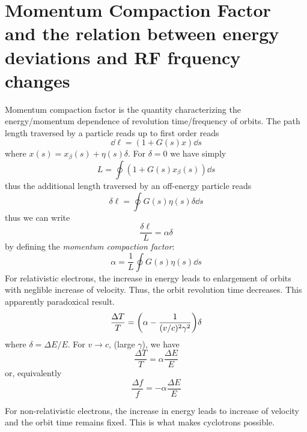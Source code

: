 \chapter{Momentum Compaction Factor and the relation between energy deviations and RF frquency changes}
Momentum compaction factor is the quantity characterizing the energy/momentum dependence of revolution time/frequency of orbits.
The path length traversed by a particle reads up to first order reads
\begin{equation}
    \dd \ell = (1 + G(s)x)\dd s
\end{equation}
where $x(s) = x_\beta(s) + \eta(s)\delta$. For $\delta = 0$ we have simply
$$L = \oint (1 + G(s)x_\beta(s))\dd{s}$$
thus the additional length traversed by an off-energy particle reads
\begin{equation}
    \delta\ell = \oint G(s)\eta(s)\delta \dd{s}
\end{equation}
thus we can write
$$\frac{\delta\ell}{L}=\alpha \delta$$
by defining the \textit{momentum compaction factor}:
\begin{equation}
    \alpha = \frac{1}{L}\oint G(s)\eta(s)\dd{s}
\end{equation}
For relativistic electrons, the increase in energy leads to enlargement of orbits with neglible increase of velocity. Thus, the orbit revolution time decreases. This apparently paradoxical result.
$$\frac{\Delta T}{T}=\qty(\alpha-\frac{1}{(v/c)^{2}\gamma^{2}})\delta$$
where $\delta = \Delta E/E$. For $v\to c$, (large $\gamma$), we have
$$\frac{\Delta T}{T}=\alpha \frac{\Delta E}{E}$$
or, equivalently
$$\frac{\Delta f}{f}=-\alpha \frac{\Delta E}{E}$$


For non-relativistic electrons, the increase in energy leads to increase of velocity and the orbit time remains fixed. This is what makes cyclotrons possible.
